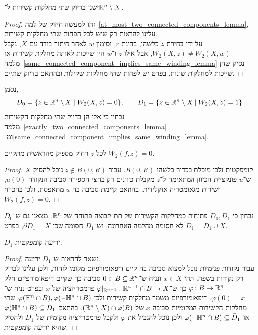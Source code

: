 \begin{lemma}\label{exactly_two_connected_components_lemma}
	ישנן בדיוק שתי מחלקות קשירות ל־$\mathbb{R}^n \setminus X$.
\end{lemma}
\begin{proof}
	זהו למעשה חיזוק של למה\ \ref{at_most_two_connected_components_lemma}, עלינו להראות רק שיש לכל הפחות שתי מחלקות קשירות. \\
	על־ידי בחירת $z$ כלשהו, בחינת $r$, וסימון $w$ לאחר חיתוך בודד עם $X$, נקבל $W_2(X, z) \ne W_2(X, w)$,
	אבל אילו $z$ ו־$w$ היו שייכות לאותה מחלקת קשירות אז מלמה\ \ref{same_connected_component_implies_same_winding_lemma} נסיק שהן שייכות למחלקות שונות, בפרט יש לפחות שתי מחלקות שקילות ובהתאם בדיוק שתיים.
\end{proof}
נסמן,
\[
	D_0 = \{ z \in \mathbb{R}^n \setminus X \mid W_2(X, z) = 0 \},
	\qquad
	D_1 = \{ z \in \mathbb{R}^n \setminus X \mid W_2(X, z) = 1 \}
\]
נבחין כי אלו הן בדיוק שתי מחלקות הקשירות מלמה\ \ref{exactly_two_connected_components_lemma} ומ־\ref{same_connected_component_implies_same_winding_lemma}.
\begin{lemma}
	לכל $z$ רחוק מספיק מהראשית מתקיים $W_2(f, z) = 0$.
\end{lemma}
\begin{proof}
	$X$ קומפקטית ולכן מוכלת בכדור כלשהו $B(0, R)$.
	עבור $z \notin B(0, R)$ נוכל להסיק ש־$u$ פונקציית הכיוון המתאימה ל־$z$ מקבלת כיוונים רק בחצי הספירה סביבה הנקודה $u(0)$, ישירות מגאומטריה אוקלידית.
	בהתאם קיימת סביבה בה $u$ מתאפסת, ולכן בהכרח $W_2(f, z) = 0$.
\end{proof}
נבחין כי $D_0, D_1$ פתוחות כמחלקות הקשירות של תת־קבוצה פתוחה של $\mathbb{R}^n$.
מצאנו גם ש־$D_0$ לא חסומה מהלמה האחרונה, וש־$D_1$ חסומה שכן $\partial D_1 = X$, בפרט $\bar{D}_1 = D_1 \cup X$.
\begin{lemma}
	$D_1$ יריעה קומפקטית.
\end{lemma}
\begin{proof}
	נשאר להראות ש־$D_1$ יריעה. \\
	עבור נקודות פנימיות נוכל למצוא סביבה בה קיים דיפאומורפיזם מקומי לזהות, ולכן עלינו לבדוק רק נקודות בשפה.
	תהי $x \in X$ ונניח ש־$0 \in B \subseteq \mathbb{R}^n$ סביבה כך שקיים דיפאומורפיזם חלק $\varphi : B \to \mathbb{R}^n$ כך ש־$\varphi|_{\mathbb{R}^{n - 1}} : \mathbb{R}^{n - 1} \cap B \to X$ פרמטריזציה של $x$ ובפרט נניח ש־$\varphi(0) = x$.
	דיפאומורפיזם משמר מחלקות קשירות ולכן $\varphi(\mathbb{H}^n \cap B), \varphi(-\mathbb{H}^n \cap B)$ שתי מחלקות הקשירות המקומיות סביבה $x$ של $(\mathbb{R}^n \setminus X) \cap \varphi(B)$.
	בהתאם $\varphi(\mathbb{H}^n \cap B) \subseteq \bar{D}_1$ או $\varphi(-\mathbb{H}^n \cap B) \subseteq \bar{D}_1$ ולכן נוכל להגביל את $\varphi$ ולקבל פרמטריזציה מקומית של $\bar{D}_1$ ולהסיק שהיא יריעה קומפקטית.
\end{proof}
